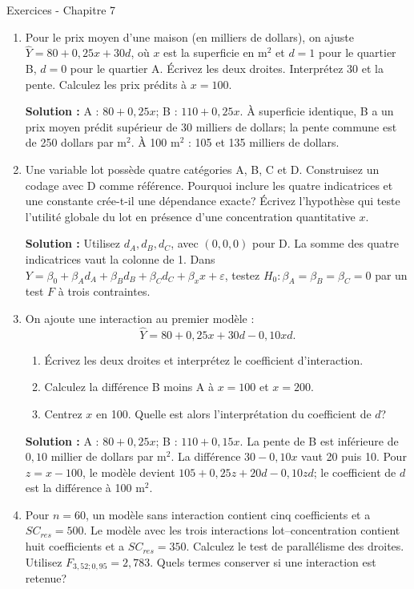 \documentclass[letterpaper,11pt]{article}
\newcommand{\prof}[1]{\ifdefined\avecsolutions\par{\color{blue}\textbf{Solution :} #1}\par\fi}
\begin{document}
\begin{center}{\Large Exercices - Chapitre 7}\end{center}
\begin{enumerate}[leftmargin=*,wide,label=\bfseries Exercice \arabic*:]
\item Pour le prix moyen d'une maison (en milliers de dollars), on ajuste
$\hat Y=80+0{,}25x+30d$, où $x$ est la superficie en m$^2$ et $d=1$ pour le quartier B, $d=0$ pour le quartier A. Écrivez les deux droites. Interprétez $30$ et la pente. Calculez les prix prédits à $x=100$.
\prof{A : $80+0{,}25x$; B : $110+0{,}25x$. À superficie identique, B a un prix moyen prédit supérieur de 30 milliers de dollars; la pente commune est de 250 dollars par m$^2$. À 100 m$^2$ : 105 et 135 milliers de dollars.}
\item Une variable \og lot\fg{} possède quatre catégories A, B, C et D. Construisez un codage avec D comme référence. Pourquoi inclure les quatre indicatrices et une constante crée-t-il une dépendance exacte? Écrivez l'hypothèse qui teste l'utilité globale du lot en présence d'une concentration quantitative $x$.
\prof{Utilisez $d_A,d_B,d_C$, avec $(0,0,0)$ pour D. La somme des quatre indicatrices vaut la colonne de 1. Dans $Y=\beta_0+\beta_A d_A+\beta_B d_B+\beta_C d_C+\beta_x x+\varepsilon$, testez $H_0:\beta_A=\beta_B=\beta_C=0$ par un test $F$ à trois contraintes.}
\item On ajoute une interaction au premier modèle :
\[
\hat Y=80+0{,}25x+30d-0{,}10xd.
\]
\begin{enumerate}[label=\alph*)]
\item Écrivez les deux droites et interprétez le coefficient d'interaction.
\item Calculez la différence B moins A à $x=100$ et $x=200$.
\item Centrez $x$ en 100. Quelle est alors l'interprétation du coefficient de $d$?
\end{enumerate}
\prof{A : $80+0{,}25x$; B : $110+0{,}15x$. La pente de B est inférieure de $0{,}10$ millier de dollars par m$^2$. La différence $30-0{,}10x$ vaut 20 puis 10. Pour $z=x-100$, le modèle devient $105+0{,}25z+20d-0{,}10zd$; le coefficient de $d$ est la différence à 100 m$^2$.}
\item Pour $n=60$, un modèle sans interaction contient cinq coefficients et a $SC_{res}=500$. Le modèle avec les trois interactions lot--concentration contient huit coefficients et a $SC_{res}=350$. Calculez le test de parallélisme des droites. Utilisez $F_{3,52;0{,}95}=2{,}783$. Quels termes conserver si une interaction est retenue?

\end{enumerate}
\end{document}
